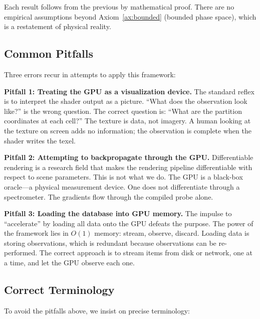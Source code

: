 \documentclass[11pt,twocolumn,a4paper]{article}
\theoremstyle{definition}
\theoremstyle{remark}
\begin{document}
Each result follows from the previous by mathematical proof. There are no empirical assumptions beyond Axiom~\ref{ax:bounded} (bounded phase space), which is a restatement of physical reality.

\subsection{Common Pitfalls}

Three errors recur in attempts to apply this framework:

\textbf{Pitfall 1: Treating the GPU as a visualization device.} The standard reflex is to interpret the shader output as a picture. ``What does the observation look like?'' is the wrong question. The correct question is: ``What are the partition coordinates at each cell?'' The texture is data, not imagery. A human looking at the texture on screen adds no information; the observation is complete when the shader writes the texel.

\textbf{Pitfall 2: Attempting to backpropagate through the GPU.} Differentiable rendering is a research field that makes the rendering pipeline differentiable with respect to scene parameters. This is not what we do. The GPU is a black-box oracle---a physical measurement device. One does not differentiate through a spectrometer. The gradients flow through the compiled probe alone.

\textbf{Pitfall 3: Loading the database into GPU memory.} The impulse to ``accelerate'' by loading all data onto the GPU defeats the purpose. The power of the framework lies in $O(1)$ memory: stream, observe, discard. Loading data is storing observations, which is redundant because observations can be re-performed. The correct approach is to stream items from disk or network, one at a time, and let the GPU observe each one.

\subsection{Correct Terminology}

To avoid the pitfalls above, we insist on precise terminology:
\end{document}
